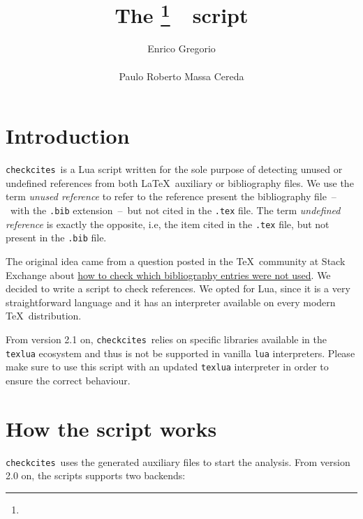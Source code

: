 \documentclass[12pt,a4paper]{article}
\title{The \checkcites\footnote{\version}\ \ script}
\author{%
  Enrico Gregorio\\\email{Enrico dot Gregorio at univr dot it}\\[3ex]
  Paulo Roberto Massa Cereda\\\email{cereda at users dot sf dot net}%
}
\date{}
\newcommand{\checkcites}{\texttt{checkcites}}
\newenvironment{infoblock}[1]
  {\par\addvspace{\medskipamount}
   \begin{tcolorbox}[colframe=DarkTurquoise,coltitle=black,fonttitle=\bfseries,title=#1]}
  {\end{tcolorbox}\addvspace{\medskipamount}}
\begin{document}
\maketitle

\tableofcontents

\section{Introduction}
\label{sec:intro}

\checkcites\  is  a  Lua  script  written for  the  sole  purpose  of
detecting unused or undefined  references from both \LaTeX\ auxiliary
or bibliography  files. We  use the  term \emph{unused  reference} to
refer  to the  reference  present the  bibliography file~--~with  the
\verb|.bib|  extension~--~but  not  cited in  the  \verb|.tex|  file.
The  term \emph{undefined  reference} is  exactly the  opposite, i.e,
the  item cited  in  the \verb|.tex|  file, but  not  present in  the
\verb|.bib| file.

The    original     idea    came     from    a     question    posted
in    the     \TeX\    community    at    Stack     Exchange    about
\href{http://tex.stackexchange.com/questions/43276}{how    to   check
which  bibliography entries  were not  used}. We  decided to  write a
script  to check  references. We  opted for  Lua, since it is a  very
straightforward language and it has an interpreter available on every
modern \TeX\ distribution.

\begin{infoblock}{Attention!}
From version 2.1 on, \checkcites\ relies on specific libraries available
in the \verb|texlua| ecosystem and thus is not be supported in vanilla
\verb|lua| interpreters. Please make sure to use this script with an
updated \verb|texlua| interpreter in order to ensure the correct behaviour.
\end{infoblock}

\section{How the script works}
\label{sec:howto}

\checkcites\  uses  the  generated   auxiliary  files  to  start  the
analysis. From version 2.0 on, the scripts supports two backends:
\end{document}
